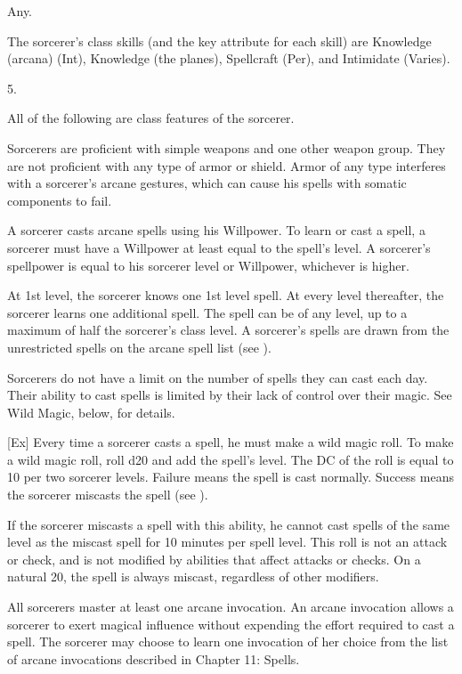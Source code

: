  Any.

The sorcerer's class skills (and the key attribute for each skill) are Knowledge (arcana) (Int), Knowledge (the planes), Spellcraft (Per), and Intimidate (Varies).

5.

All of the following are class features of the sorcerer.

Sorcerers are proficient with simple weapons  and one other weapon group.
They are not proficient with any type of armor or shield.
Armor of any type interferes with a sorcerer's arcane gestures, which can cause his spells with somatic components to fail.

A sorcerer casts arcane spells using his Willpower.
To learn or cast a spell, a sorcerer must have a Willpower at least equal to the spell's level.
A sorcerer's spellpower is equal to his sorcerer level or Willpower, whichever is higher.

At 1st level, the sorcerer knows one 1st level spell.
At every level thereafter, the sorcerer learns one additional spell.
The spell can be of any level, up to a maximum of half the sorcerer's class level.
A sorcerer's spells are drawn from the unrestricted spells on the arcane spell list (see ).

Sorcerers do not have a limit on the number of spells they can cast each day.
Their ability to cast spells is limited by their lack of control over their magic.
See Wild Magic, below, for details.

[Ex]
Every time a sorcerer casts a spell, he must make a wild magic roll.
To make a wild magic roll, roll d20 and add the spell's level.
The DC of the roll is equal to 10  per two sorcerer levels.
Failure means the spell is cast normally.
Success means the sorcerer miscasts the spell (see ).

If the sorcerer miscasts a spell with this ability, he cannot cast spells of the same level as the miscast spell for 10 minutes per spell level.
This roll is not an attack or check, and is not modified by abilities that affect attacks or checks.
On a natural 20, the spell is always miscast, regardless of other modifiers.

All sorcerers master at least one arcane invocation.
An arcane invocation allows a sorcerer to exert magical influence without expending the effort required to cast a spell.
The sorcerer may choose to learn one invocation of her choice from the list of arcane invocations described in Chapter 11: Spells.

